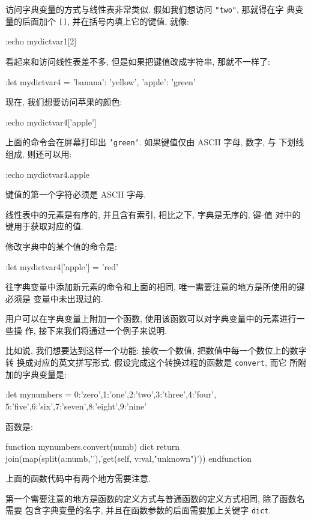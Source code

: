 访问字典变量的方式与线性表非常类似. 假如我们想访问 \texttt{"two"}, 那就得在字
典变量的后面加个 \texttt{[]}, 并在括号内填上它的键值, 就像:
\begin{vimcode}
:echo mydictvar1[2]
\end{vimcode}

看起来和访问线性表差不多, 但是如果把键值改成字符串, 那就不一样了:
\begin{vimcode}
:let mydictvar4 = {'banana': 'yellow', 'apple': 'green'}
\end{vimcode}
现在, 我们想要访问苹果的颜色:
\begin{vimcode}
:echo mydictvar4['apple']
\end{vimcode}
上面的命令会在屏幕打印出 \texttt{'green'}. 如果键值仅由 ASCII 字母, 数字, 与
下划线组成, 则还可以用:
\begin{vimcode}
:echo mydictvar4.apple
\end{vimcode}
键值的第一个字符必须是 ASCII 字母.

线性表中的元素是有序的, 并且含有索引, 相比之下, 字典是无序的, \mbox{键}-值
对中的键用于获取对应的值.

修改字典中的某个值的命令是:
\begin{vimcode}
:let mydictvar4['apple'] = 'red'
\end{vimcode}
往字典变量中添加新元素的命令和上面的相同, 唯一需要注意的地方是所使用的键必须是
变量中未出现过的.

用户可以在字典变量上附加一个函数, 使用该函数可以对字典变量中的元素进行一些操
作, 接下来我们将通过一个例子来说明.

比如说, 我们想要达到这样一个功能: 接收一个数值, 把数值中每一个数位上的数字转
换成对应的英文拼写形式. 假设完成这个转换过程的函数是 \texttt{convert}, 而它
所附加的字典变量是:
\begin{vimcode}
:let mynumbers = {0:'zero',1:'one',2:'two',3:'three',4:'four',
                5:'five',6:'six',7:'seven',8:'eight',9:'nine'}
\end{vimcode}
函数是:
\begin{vimcode}
function mynumbers.convert(numb) dict
    return join(map(split(a:numb,'\zs'),'get(self, v:val,"unknown")'))
endfunction
\end{vimcode}
上面的函数代码中有两个地方需要注意.

第一个需要注意的地方是函数的定义方式与普通函数的定义方式相同, 除了函数名需要
包含字典变量的名字, 并且在函数参数的后面需要加上关键字 \texttt{dict}.
